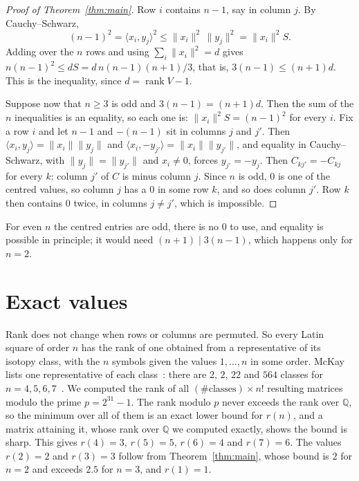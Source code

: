 \documentclass[11pt]{amsart}
\theoremstyle{remark}
\DeclareMathOperator{\rank}{rank}
\begin{document}
\begin{proof}[Proof of Theorem~\ref{thm:main}]
Row $i$ contains $n-1$, say in column $j$. By Cauchy--Schwarz,
\[
(n-1)^2=\langle x_i,y_j\rangle^2\le\|x_i\|^2\,\|y_j\|^2=\|x_i\|^2S.
\]
Adding over the $n$ rows and using $\sum_i\|x_i\|^2=d$ gives $n(n-1)^2\le dS=d\,n(n-1)(n+1)/3$, that is, $3(n-1)\le(n+1)d$. This is the inequality, since $d=\rank V-1$.

Suppose now that $n\ge3$ is odd and $3(n-1)=(n+1)d$. Then the sum of the $n$ inequalities is an equality, so each one is: $\|x_i\|^2S=(n-1)^2$ for every $i$. Fix a row $i$ and let $n-1$ and $-(n-1)$ sit in columns $j$ and $j'$. Then $\langle x_i,y_j\rangle=\|x_i\|\|y_j\|$ and $\langle x_i,-y_{j'}\rangle=\|x_i\|\|y_{j'}\|$, and equality in Cauchy--Schwarz, with $\|y_j\|=\|y_{j'}\|$ and $x_i\ne0$, forces $y_{j'}=-y_j$. Then $C_{kj'}=-C_{kj}$ for every $k$: column $j'$ of $C$ is minus column $j$. Since $n$ is odd, $0$ is one of the centred values, so column $j$ has a $0$ in some row $k$, and so does column $j'$. Row $k$ then contains $0$ twice, in columns $j\ne j'$, which is impossible.
\end{proof}

For even $n$ the centred entries are odd, there is no $0$ to use, and equality is possible in principle; it would need $(n+1)\mid 3(n-1)$, which happens only for $n=2$.

\section{Exact values}\label{sec:values}

Rank does not change when rows or columns are permuted. So every Latin square of order $n$ has the rank of one obtained from a representative of its isotopy class, with the $n$ symbols given the values $1,\dots,n$ in some order. McKay lists one representative of each class~\cite{McKay}: there are $2$, $2$, $22$ and $564$ classes for $n=4,5,6,7$~\cite{OEIS}. We computed the rank of all $(\#\text{classes})\times n!$ resulting matrices modulo the prime $p=2^{31}-1$. The rank modulo $p$ never exceeds the rank over $\mathbb Q$, so the minimum over all of them is an exact lower bound for $r(n)$, and a matrix attaining it, whose rank over $\mathbb Q$ we computed exactly, shows the bound is sharp. This gives $r(4)=3$, $r(5)=5$, $r(6)=4$ and $r(7)=6$. The values $r(2)=2$ and $r(3)=3$ follow from Theorem~\ref{thm:main}, whose bound is $2$ for $n=2$ and exceeds $2.5$ for $n=3$, and $r(1)=1$.
\end{document}
